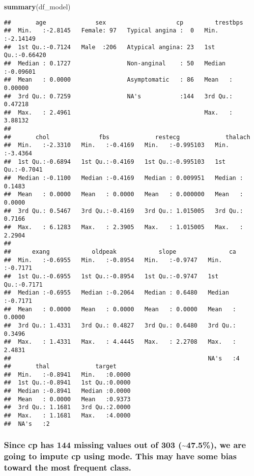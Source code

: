 \documentclass[
]{article}
\newenvironment{Shaded}{\begin{snugshade}}{\end{snugshade}}
\newcommand{\FunctionTok}[1]{\textcolor[rgb]{0.13,0.29,0.53}{\textbf{#1}}}
\newcommand{\NormalTok}[1]{#1}
\begin{document}
\begin{Shaded}
\begin{Highlighting}[]
\FunctionTok{summary}\NormalTok{(df\_model)}
\end{Highlighting}
\end{Shaded}

\begin{verbatim}
##       age              sex                    cp         trestbps       
##  Min.   :-2.8145   Female: 97   Typical angina :  0   Min.   :-2.14149  
##  1st Qu.:-0.7124   Male  :206   Atypical angina: 23   1st Qu.:-0.66420  
##  Median : 0.1727                Non-anginal    : 50   Median :-0.09601  
##  Mean   : 0.0000                Asymptomatic   : 86   Mean   : 0.00000  
##  3rd Qu.: 0.7259                NA's           :144   3rd Qu.: 0.47218  
##  Max.   : 2.4961                                      Max.   : 3.88132  
##                                                                         
##       chol              fbs             restecg             thalach       
##  Min.   :-2.3310   Min.   :-0.4169   Min.   :-0.995103   Min.   :-3.4364  
##  1st Qu.:-0.6894   1st Qu.:-0.4169   1st Qu.:-0.995103   1st Qu.:-0.7041  
##  Median :-0.1100   Median :-0.4169   Median : 0.009951   Median : 0.1483  
##  Mean   : 0.0000   Mean   : 0.0000   Mean   : 0.000000   Mean   : 0.0000  
##  3rd Qu.: 0.5467   3rd Qu.:-0.4169   3rd Qu.: 1.015005   3rd Qu.: 0.7166  
##  Max.   : 6.1283   Max.   : 2.3905   Max.   : 1.015005   Max.   : 2.2904  
##                                                                           
##      exang            oldpeak            slope               ca         
##  Min.   :-0.6955   Min.   :-0.8954   Min.   :-0.9747   Min.   :-0.7171  
##  1st Qu.:-0.6955   1st Qu.:-0.8954   1st Qu.:-0.9747   1st Qu.:-0.7171  
##  Median :-0.6955   Median :-0.2064   Median : 0.6480   Median :-0.7171  
##  Mean   : 0.0000   Mean   : 0.0000   Mean   : 0.0000   Mean   : 0.0000  
##  3rd Qu.: 1.4331   3rd Qu.: 0.4827   3rd Qu.: 0.6480   3rd Qu.: 0.3496  
##  Max.   : 1.4331   Max.   : 4.4445   Max.   : 2.2708   Max.   : 2.4831  
##                                                        NA's   :4        
##       thal             target      
##  Min.   :-0.8941   Min.   :0.0000  
##  1st Qu.:-0.8941   1st Qu.:0.0000  
##  Median :-0.8941   Median :0.0000  
##  Mean   : 0.0000   Mean   :0.9373  
##  3rd Qu.: 1.1681   3rd Qu.:2.0000  
##  Max.   : 1.1681   Max.   :4.0000  
##  NA's   :2
\end{verbatim}

\subsubsection{Since cp has 144 missing values out of 303
(\textasciitilde47.5\%), we are going to impute cp using mode. This may
have some bias toward the most frequent
class.}\label{since-cp-has-144-missing-values-out-of-303-47.5-we-are-going-to-impute-cp-using-mode.-this-may-have-some-bias-toward-the-most-frequent-class.}
\end{document}
